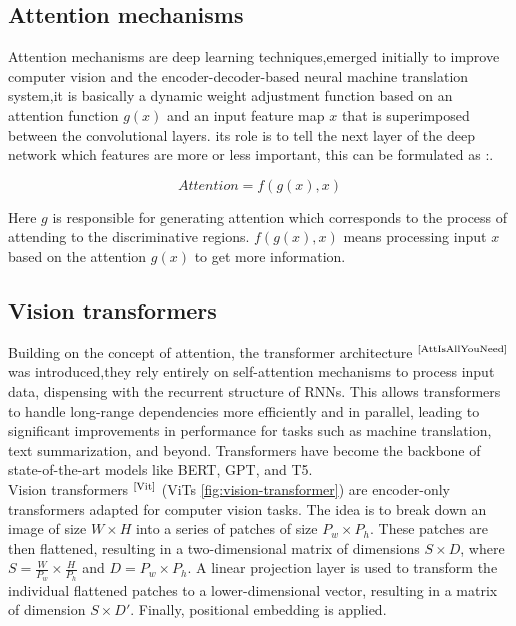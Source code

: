 \documentclass[
11pt, %
english, %
singlespacing, %
headsepline, %
]{project_structure}
\begin{document}
\newpage

\subsection{Attention mechanisms}

\noindent Attention mechanisms are deep learning techniques,emerged initially to improve computer vision and the encoder-decoder-based neural machine translation system,it is basically a dynamic weight adjustment function based on an attention function $g(x)$ and an input feature map $x$ that is superimposed between the convolutional layers. its role is to tell the next layer of the deep network which features are more or less important, this can be formulated as :.

$$
Attention = f(g(x), x)
$$

\noindent Here $g$ is responsible for generating attention which
corresponds to the process of attending to the discriminative
regions. $f(g(x), x)$ means processing input $x$ based on the
attention $g(x)$ to get more information.

\subsection{Vision transformers}

\noindent Building on the concept of attention, the transformer architecture $^{\text{\cite{AttIsAllYouNeed}}}$ was introduced,they rely entirely on self-attention mechanisms to process input data, dispensing with the recurrent structure of \acrshort{RNN}s. This allows transformers to handle long-range dependencies more efficiently and in parallel, leading to significant improvements in performance for tasks such as machine translation, text summarization, and beyond. Transformers have become the backbone of state-of-the-art models like \acrshort{BERT}, \acrshort{GPT}, and \acrshort{T5}.\\

\noindent Vision transformers $^\text{\cite{Vit}}$ (\acrshort{ViT}s \autoref{fig:vision-transformer}) are encoder-only transformers adapted for computer vision tasks. The idea is to break down an image of size $W \times H$ into a series of patches of size $P_w \times P_h$. These patches are then flattened, resulting in a two-dimensional matrix of dimensions $S \times D$, where $S = \frac{W}{P_w} \times \frac{H}{P_h}$ and $D = P_w \times P_h$. A linear projection layer is used to transform the individual flattened patches to a lower-dimensional vector, resulting in a matrix of dimension $S \times D'$. Finally, positional embedding is applied.\\
\end{document}
